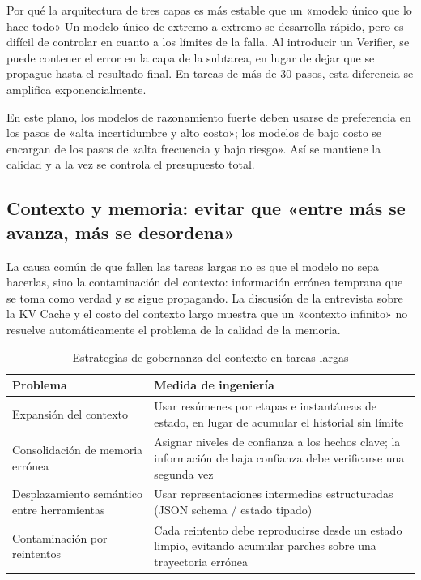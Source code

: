 \documentclass[a4paper]{article}
\begin{document}
\begin{knowledgebox}{Por qué la arquitectura de tres capas es más estable que un «modelo único que lo hace todo»}
Un modelo único de extremo a extremo se desarrolla rápido, pero es difícil de controlar en cuanto a los límites de la falla. Al introducir un Verifier, se puede contener el error en la capa de la subtarea, en lugar de dejar que se propague hasta el resultado final. En tareas de más de 30 pasos, esta diferencia se amplifica exponencialmente.
\end{knowledgebox}

En este plano, los modelos de razonamiento fuerte deben usarse de preferencia en los pasos de «alta incertidumbre y alto costo»; los modelos de bajo costo se encargan de los pasos de «alta frecuencia y bajo riesgo». Así se mantiene la calidad y a la vez se controla el presupuesto total.

\subsection{Contexto y memoria: evitar que «entre más se avanza, más se desordena»}

La causa común de que fallen las tareas largas no es que el modelo no sepa hacerlas, sino la contaminación del contexto: información errónea temprana que se toma como verdad y se sigue propagando. La discusión de la entrevista sobre la KV Cache y el costo del contexto largo muestra que un «contexto infinito» no resuelve automáticamente el problema de la calidad de la memoria.

\begin{table}[H]
\centering
\begin{tabular}{lp{8.7cm}}
\toprule
\textbf{Problema} & \textbf{Medida de ingeniería} \\
\midrule
Expansión del contexto & Usar resúmenes por etapas e instantáneas de estado, en lugar de acumular el historial sin límite \\
Consolidación de memoria errónea & Asignar niveles de confianza a los hechos clave; la información de baja confianza debe verificarse una segunda vez \\
Desplazamiento semántico entre herramientas & Usar representaciones intermedias estructuradas (JSON schema / estado tipado) \\
Contaminación por reintentos & Cada reintento debe reproducirse desde un estado limpio, evitando acumular parches sobre una trayectoria errónea \\
\bottomrule
\end{tabular}
\caption{Estrategias de gobernanza del contexto en tareas largas}
\end{table}
\end{document}
